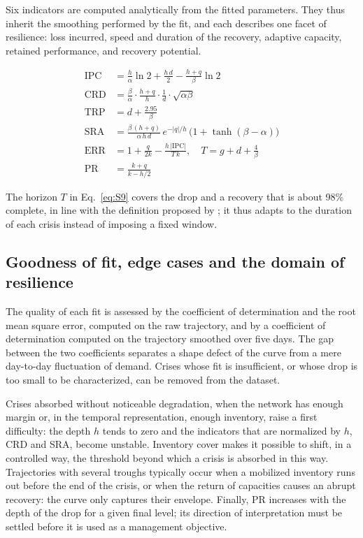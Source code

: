 Six indicators are computed analytically from the fitted parameters. They thus inherit the smoothing performed by the fit, and each describes one facet of resilience: loss incurred, speed and duration of the recovery, adaptive capacity, retained performance, and recovery potential.

\begin{align}
\mathrm{IPC} &= \frac{h}{\alpha}\ln 2 + \frac{h\,d}{2} - \frac{h + q}{\beta}\ln 2 \label{eq:S5} \\
\mathrm{CRD} &= \frac{\beta}{\alpha}\cdot\frac{h + q}{h}\cdot\frac{1}{d}\cdot\sqrt{\alpha\beta} \label{eq:S6} \\
\mathrm{TRP} &= d + \frac{2.95}{\beta} \label{eq:S7} \\
\mathrm{SRA} &= \frac{\beta\,(h + q)}{\alpha\,h\,d}\, e^{-|q|/h}\,\big(1 + \tanh(\beta - \alpha)\big) \label{eq:S8} \\
\mathrm{ERR} &= 1 + \frac{q}{2k} - \frac{h\,|\mathrm{IPC}|}{T\,k}, \quad T = g + d + \frac{4}{\beta} \label{eq:S9} \\
\mathrm{PR} &= \frac{k + q}{k - h/2} \label{eq:S10}
\end{align}

The horizon $T$ in Eq.~\eqref{eq:S9} covers the drop and a recovery that is about 98\% complete, in line with the definition proposed by \citet{rahiel2026in4pl}; it thus adapts to the duration of each crisis instead of imposing a fixed window.

\subsection{Goodness of fit, edge cases and the domain of resilience}
\label{sec:S4.3}

The quality of each fit is assessed by the coefficient of determination and the root mean square error, computed on the raw trajectory, and by a coefficient of determination computed on the trajectory smoothed over five days. The gap between the two coefficients separates a shape defect of the curve from a mere day-to-day fluctuation of demand. Crises whose fit is insufficient, or whose drop is too small to be characterized, can be removed from the dataset.

Crises absorbed without noticeable degradation, when the network has enough margin or, in the temporal representation, enough inventory, raise a first difficulty: the depth $h$ tends to zero and the indicators that are normalized by $h$, CRD and SRA, become unstable. Inventory cover makes it possible to shift, in a controlled way, the threshold beyond which a crisis is absorbed in this way. Trajectories with several troughs typically occur when a mobilized inventory runs out before the end of the crisis, or when the return of capacities causes an abrupt recovery: the curve only captures their envelope. Finally, PR increases with the depth of the drop for a given final level; its direction of interpretation must be settled before it is used as a management objective.

